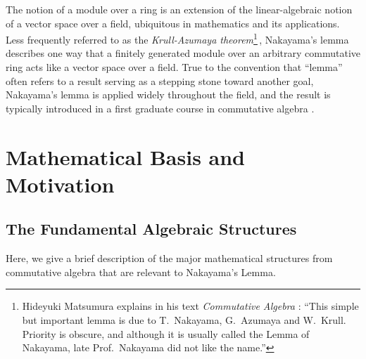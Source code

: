 \documentclass{article}
\begin{document}
The notion of a module over a ring is an extension of the linear-algebraic notion of a vector space over a field, ubiquitous in mathematics and its applications. 
Less frequently referred to as the \emph{Krull-Azumaya theorem}\footnote{Hideyuki Matsumura explains in his text \emph{Commutative Algebra} \cite{matsumura}:  ``{This simple but important lemma is due to T.\ Nakayama, G.\ Azumaya
and W.\ Krull. Priority is obscure, and although it is usually called the Lemma of Nakayama, late Prof.\  Nakayama did not like the name.''}}\,\cite{nagata}, Nakayama's lemma 
describes one way that a finitely generated module over an arbitrary commutative ring acts like a vector space over a field.  
True to the convention that ``lemma'' often refers to a result serving as a stepping stone toward another goal, Nakayama's lemma is applied widely throughout the field, and the result is typically introduced in a first graduate course in commutative algebra \cite{atiyah-macdonald, matsumura, eisenbud}.   






\section{Mathematical Basis and Motivation}

\subsection{The Fundamental Algebraic Structures}

Here, we give a brief description of the major mathematical structures from commutative algebra that are relevant to Nakayama's Lemma.

\end{document}
